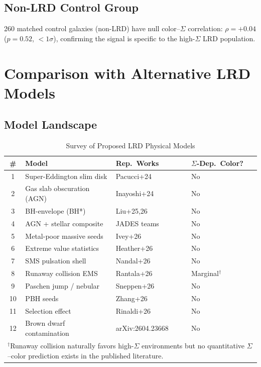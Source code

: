 \documentclass[apj,twocolumn,longbibliography,linenumbers]{aastex701}
\begin{document}
\subsection{Non-LRD Control Group}

260 matched control galaxies (non-LRD) have null color--$\Sigma$ correlation: $\rho = +0.04$ ($p = 0.52$, $< 1\sigma$), confirming the signal is specific to the high-$\Sigma$ LRD population.

\section{Comparison with Alternative LRD Models}

\subsection{Model Landscape}

\begin{table}
\caption{Survey of Proposed LRD Physical Models}
\label{tab:models}
\centering
\scriptsize
\begin{tabular}{clll}
\toprule
\# & Model & Rep.\ Works & $\Sigma$-Dep.\ Color? \\
\midrule
1 & Super-Eddington slim disk & Pacucci+24 & No \\
2 & Gas slab obscuration (AGN) & Inayoshi+24 & No \\
3 & BH-envelope (BH*) & Liu+25,26 & No \\
4 & AGN + stellar composite & JADES teams & No \\
5 & Metal-poor massive seeds & Ivey+26 & No \\
6 & Extreme value statistics & Heather+26 & No \\
7 & SMS pulsation shell & Nandal+26 & No \\
8 & Runaway collision EMS & Rantala+26 & Marginal$^{\dagger}$ \\
9 & Paschen jump / nebular & Sneppen+26 & No \\
10 & PBH seeds & Zhang+26 & No \\
11 & Selection effect & Rinaldi+26 & No \\
12 & Brown dwarf contamination & arXiv:2604.23668 & No \\
\bottomrule
\multicolumn{4}{l}{$^{\dagger}$\scriptsize Runaway collision naturally favors high-$\Sigma$ environments but no quantitative $\Sigma$--color prediction exists in the published literature.} \\
\end{tabular}
\end{table}
\end{document}
